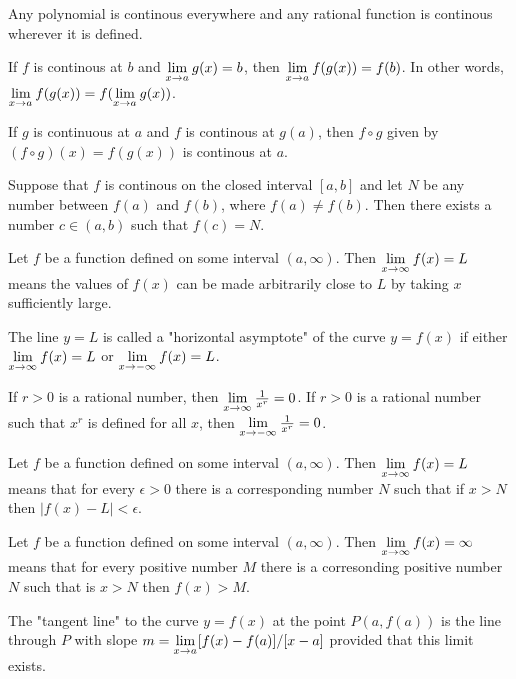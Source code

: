 \documentclass[a4paper,11pt]{article}
\begin{document}
\begin{outline}
    Any polynomial is continous everywhere and any rational function is continous wherever it is defined.
    
    If \(f\) is continous at \(b\) and \(\lim\limits_{x\rightarrow a^{}} g(x) = b\), then \(\lim\limits_{x\rightarrow a^{}} f(g(x)) = f(b)\).
    In other words, \(\lim\limits_{x\rightarrow a^{}} f(g(x)) = f(\lim\limits_{x\rightarrow a^{}} g(x))\).

    If \(g\) is continuous at \(a\) and \(f\) is continous at \(g(a)\), then \(f \circ g\) given by
    \((f \circ g)(x) = f(g(x))\) is continous at \(a\).
    
    Suppose that \(f\) is continous on the closed interval \([a, b]\) and let \(N\) be any number between
    \(f(a)\) and \(f(b)\), where \(f(a) \neq f(b)\). Then there exists a number \(c \in (a, b)\) such that
    \(f(c) = N\).
    
    Let \(f\) be a function defined on some interval \((a, \infty)\). Then \(\lim\limits_{x\rightarrow \infty^{}} f(x) = L\)
    means the values of \(f(x)\) can be made arbitrarily close to \(L\) by taking \(x\) sufficiently large.
    
    The line \(y = L\) is called a "horizontal asymptote" of the curve \(y = f(x)\) if either \(\lim\limits_{x\rightarrow \infty^{}}
    f(x)=L\) or \(\lim\limits_{x\rightarrow -\infty^{}} f(x) = L\).
    
    If \(r > 0\) is a rational number, then \(\lim\limits_{x\rightarrow \infty^{}} \frac{1}{x^r} = 0\). If \(r > 0\) is
    a rational number such that \(x^r\) is defined for all \(x\), then \(\lim\limits_{x\rightarrow -\infty^{}} \frac{1}{x^r} = 0\).
    
    Let \(f\) be a function defined on some interval \((a, \infty)\). Then \(\lim\limits_{x\rightarrow \infty^{}} f(x) = L\) means
    that for every \(\epsilon > 0\) there is a corresponding number \(N\) such that if \(x > N\) then \(|f(x)-L| 
    < \epsilon\).
    
    Let \(f\) be a function defined on some interval \((a, \infty)\). Then \(\lim\limits_{x\rightarrow \infty^{}}f(x)=\infty\) means
    that for every positive number \(M\) there is a corresonding positive number \(N\) such that is \(x > N\) then
    \(f(x) > M\).
    
    The "tangent line" to the curve \(y = f(x)\) at the point \(P(a, f(a))\) is the line through \(P\) with slope
    \(m = \lim\limits_{x\rightarrow a^{}} [f(x)-f(a)]/[x-a]\) provided that this limit exists.
    

\end{outline}
\end{document}

